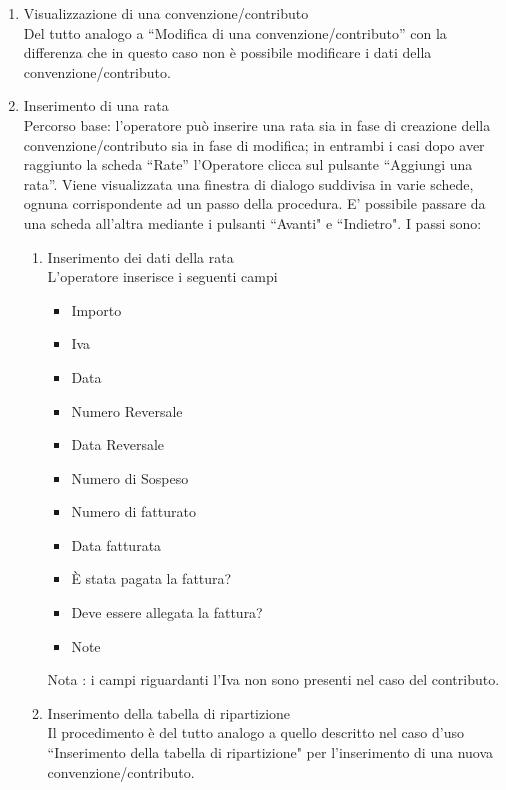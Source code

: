 \begin{enumerate}
\item Visualizzazione di una convenzione/contributo\\
 
  Del tutto analogo a ``Modifica di una convenzione/contributo'' con la differenza che in questo caso non è possibile modificare i dati della
  convenzione/contributo.
  
  
  
\item Inserimento di una rata\\
Percorso base:
l'operatore può inserire una rata sia in fase di creazione della convenzione/contributo sia in fase di modifica; in entrambi i casi dopo aver raggiunto
la scheda ``Rate'' l'Operatore clicca sul pulsante ``Aggiungi una rata''.  
Viene visualizzata una finestra di dialogo suddivisa in varie schede,
ognuna corrispondente ad un passo della procedura. E' possibile passare da una scheda all'altra mediante i pulsanti ``Avanti" e ``Indietro". I passi sono:
\begin{enumerate}
  \item Inserimento dei dati della rata\\
  
  L'operatore inserisce i seguenti campi
    \begin{itemize}
    \item Importo
    \item Iva
    \item Data
    \item Numero Reversale
    \item Data Reversale
    \item Numero di Sospeso
    \item Numero di fatturato
    \item Data fatturata
    \item È stata pagata la fattura?
    \item Deve essere allegata la fattura?
    \item Note
    \end{itemize}
    
   Nota : i campi riguardanti l'Iva non sono presenti nel caso del contributo.

   
  \item Inserimento della tabella di ripartizione\\
  
  Il procedimento è del tutto analogo  a quello descritto nel caso d'uso ``Inserimento della tabella di ripartizione" per l'inserimento di 
  una nuova convenzione/contributo. 
\end{enumerate}


\end{enumerate}
